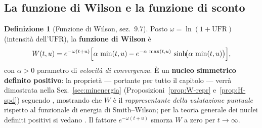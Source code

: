 \documentclass[11pt,a4paper]{article}
\theoremstyle{plain}
\theoremstyle{definition}
\newtheorem{definizione}[teorema]{Definizione}
\theoremstyle{remark}
\newcommand{\UFR}{\ensuremath{\mathrm{UFR}}}
\newcommand{\Qmat}{\mathbf{Q}}
\begin{document}
%
%

\subsection{La funzione di Wilson e la funzione di sconto}
\label{sub:kernel-W}

\begin{definizione}[Funzione di Wilson, \cite{eiopa2025} sez.~9.7]
Posto $\omega = \ln(1+\UFR)$ (intensit\`a dell'$\UFR$), la \textbf{funzione di Wilson} \`e
\[
  W(t,u) = e^{-\omega(t+u)}\Bigl[\alpha\,\min(t,u)
           - e^{-\alpha\,\max(t,u)}\,\sinh\!\bigl(\alpha\,\min(t,u)\bigr)\Bigr],
\]
con $\alpha>0$ parametro di \emph{velocit\`a di convergenza}. \`E un \textbf{nucleo simmetrico
definito positivo}: la propriet\`a --- portante per tutto il capitolo --- verr\`a dimostrata
nella Sez.~\ref{sec:minenergia} (Proposizioni~\ref{prop:W-repr} e~\ref{prop:H-spd}) seguendo
\cite{gach2017}, mostrando che $W$ \`e il \emph{rappresentante della valutazione puntuale}
rispetto al funzionale di energia di Smith--Wilson;
per la teoria generale dei nuclei definiti positivi si vedano \cite{fasshauer2007,lageras2016}.
Il fattore $e^{-\omega(t+u)}$ smorza $W$ a zero per
$t\to\infty$.%
\end{definizione}
\end{document}
